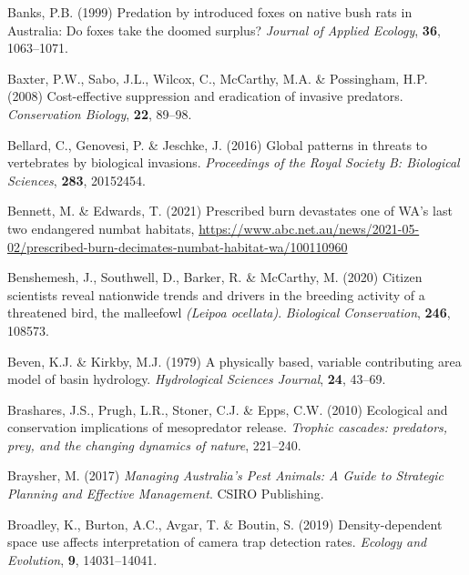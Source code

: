 \documentclass[]{elsarticle} %
\begin{document}
\leavevmode\hypertarget{ref-banks1999predation}{}%
Banks, P.B. (1999) Predation by introduced foxes on native bush rats in Australia: Do foxes take the doomed surplus? \emph{Journal of Applied Ecology}, \textbf{36}, 1063--1071.

\leavevmode\hypertarget{ref-baxter2008cost}{}%
Baxter, P.W., Sabo, J.L., Wilcox, C., McCarthy, M.A. \& Possingham, H.P. (2008) Cost-effective suppression and eradication of invasive predators. \emph{Conservation Biology}, \textbf{22}, 89--98.

\leavevmode\hypertarget{ref-bellard2016global}{}%
Bellard, C., Genovesi, P. \& Jeschke, J. (2016) Global patterns in threats to vertebrates by biological invasions. \emph{Proceedings of the Royal Society B: Biological Sciences}, \textbf{283}, 20152454.

\leavevmode\hypertarget{ref-bennett2021prescribed}{}%
Bennett, M. \& Edwards, T. (2021) Prescribed burn devastates one of WA's last two endangered numbat habitats, \url{https://www.abc.net.au/news/2021-05-02/prescribed-burn-decimates-numbat-habitat-wa/100110960}

\leavevmode\hypertarget{ref-benshemesh2020citizen}{}%
Benshemesh, J., Southwell, D., Barker, R. \& McCarthy, M. (2020) Citizen scientists reveal nationwide trends and drivers in the breeding activity of a threatened bird, the malleefowl \emph{(Leipoa ocellata)}. \emph{Biological Conservation}, \textbf{246}, 108573.

\leavevmode\hypertarget{ref-beven1979physically}{}%
Beven, K.J. \& Kirkby, M.J. (1979) A physically based, variable contributing area model of basin hydrology. \emph{Hydrological Sciences Journal}, \textbf{24}, 43--69.

\leavevmode\hypertarget{ref-brashares2010ecological}{}%
Brashares, J.S., Prugh, L.R., Stoner, C.J. \& Epps, C.W. (2010) Ecological and conservation implications of mesopredator release. \emph{Trophic cascades: predators, prey, and the changing dynamics of nature}, 221--240.

\leavevmode\hypertarget{ref-braysher2017managing}{}%
Braysher, M. (2017) \emph{Managing Australia's Pest Animals: A Guide to Strategic Planning and Effective Management}. CSIRO Publishing.

\leavevmode\hypertarget{ref-broadley2019density}{}%
Broadley, K., Burton, A.C., Avgar, T. \& Boutin, S. (2019) Density-dependent space use affects interpretation of camera trap detection rates. \emph{Ecology and Evolution}, \textbf{9}, 14031--14041.
\end{document}
